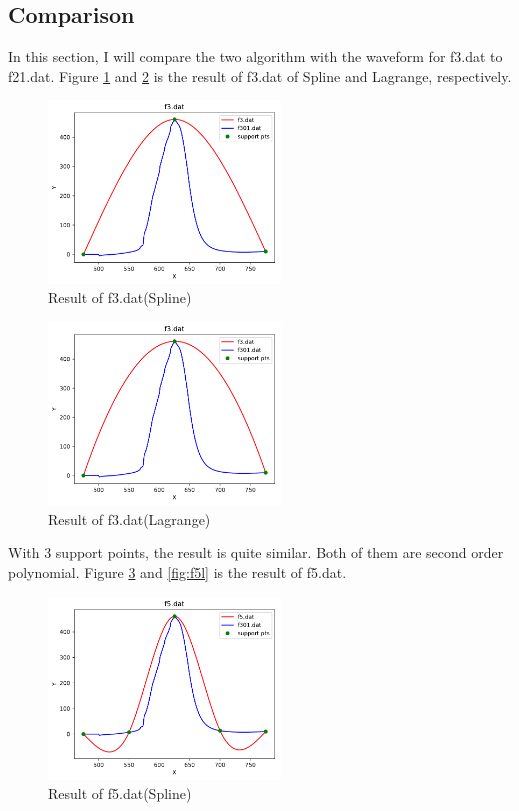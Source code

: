 \documentclass{article}
\begin{document}
\subsection{Comparison}
In this section, I will compare the two algorithm with the waveform for f3.dat to f21.dat. Figure \ref{fig:f3} and \ref{fig:f3l} is the result
of f3.dat of Spline and Lagrange, respectively.
\begin{figure}[H]
    \centering
    \includegraphics[width=0.55\textwidth]{src/f3.pdf}
    \caption{Result of f3.dat(Spline)}
    \label{fig:f3}
\end{figure}
\begin{figure}[H]
    \centering
    \includegraphics[width=0.55\textwidth]{src/f3_l.pdf}
    \caption{Result of f3.dat(Lagrange)}
    \label{fig:f3l}
\end{figure}
With 3 support points, the result is quite similar. Both of them are second order polynomial. Figure \ref{fig:f5} and \ref{fig:f5l} is the result of
f5.dat.
\begin{figure}[H]
    \centering
    \includegraphics[width=0.55\textwidth]{src/f5.pdf}
    \caption{Result of f5.dat(Spline)}
    \label{fig:f5}
\end{figure}
\end{document}
